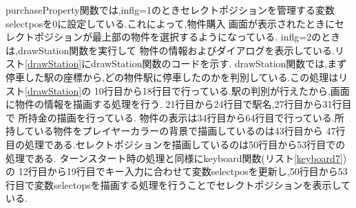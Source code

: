 \documentclass[a4j]{jarticle}
\begin{document}
    purchaseProperty関数では,inflg=1のときセレクトポジションを管理する変数selectposを0に設定している.これによって,物件購入
    画面が表示されたときにセレクトポジションが最上部の物件を選択するようになっている. inflg=2のときは,drawStation関数を実行して
    物件の情報およびダイアログを表示している.リスト\ref{drawStation}にdrawStation関数のコードを示す.
    drawStation関数では,まず停車した駅の座標から,どの物件駅に停車したのかを判別している.この処理はリスト\ref{drawStation}の
    10行目から18行目で行っている.駅の判別が行えたから,画面に物件の情報を描画する処理を行う. 21行目から24行目で駅名,27行目から31行目で
    所持金の描画を行っている. 物件の表示は34行目から64行目で行っている.所持している物件をプレイヤーカラーの背景で描画しているのは43行目から
    47行目の処理である.セレクトポジションを描画しているのは50行目から53行目での処理である. ターンスタート時の処理と同様にkeyboard関数(リスト\ref{keyboard7})の
    12行目から19行目でキー入力に合わせて変数selectposを更新し,50行目から53行目で変数selectopsを描画する処理を行うことでセレクトポジションを表示している.\\
    
\end{document}
